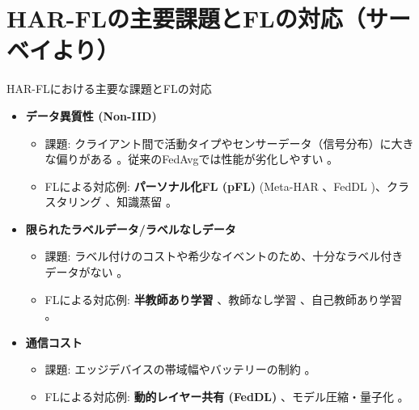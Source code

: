 \documentclass[unicode,12pt,aspectratio=169,dvipdfmx]{beamer}
\begin{document}
\section{HAR-FLの主要課題とFLの対応（サーベイより）}
\begin{frame}{HAR-FLにおける主要な課題とFLの対応}
    \begin{itemize}
        \item \textbf{データ異質性 (Non-IID)} \cite{Source544, Source55}
        \begin{itemize}
            \item 課題: クライアント間で活動タイプやセンサーデータ（信号分布）に大きな偏りがある \cite{Source55, Source418, Source521}。従来のFedAvgでは性能が劣化しやすい \cite{Source55, Source420}。
            \item FLによる対応例: \textbf{パーソナル化FL (pFL)} \cite{Source544} (Meta-HAR \cite{Source418}、FedDL \cite{Source254})、クラスタリング \cite{Source143}、知識蒸留 \cite{Source90}。
        \end{itemize}
        \item \textbf{限られたラベルデータ/ラベルなしデータ} \cite{Source55, Source544}
        \begin{itemize}
            \item 課題: ラベル付けのコストや希少なイベントのため、十分なラベル付きデータがない \cite{Source55, Source521}。
            \item FLによる対応例: \textbf{半教師あり学習} \cite{Source15, Source96}、教師なし学習 \cite{Source96}、自己教師あり学習 \cite{Source96}。
        \end{itemize}
        \item \textbf{通信コスト} \cite{Source55, Source544}
        \begin{itemize}
            \item 課題: エッジデバイスの帯域幅やバッテリーの制約 \cite{Source55, Source521}。
            \item FLによる対応例: \textbf{動的レイヤー共有 (FedDL)} \cite{Source254, Source256}、モデル圧縮・量子化 \cite{Source254}。
        \end{itemize}
    \end{itemize}
\end{frame}
\end{document}
